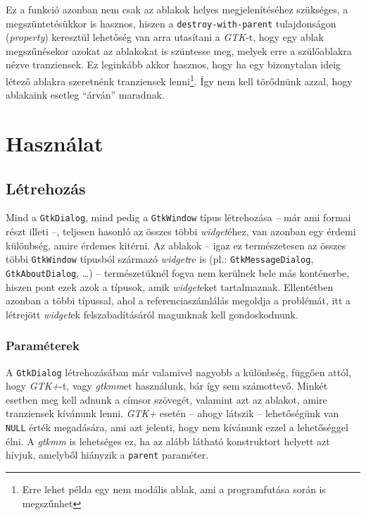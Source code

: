 Ez a funkció azonban nem csak az ablakok helyes megjelenítéséhez szükséges, a megszüntetésükkor is hasznos, hiszen a \texttt{destroy-with-parent} tulajdonságon (\textit{property}) keresztül lehetőség van arra utasítani a \textit{GTK}-t, hogy egy ablak megszűnésekor azokat az ablakokat is szüntesse meg, melyek erre a szülőablakra nézve tranziensek. Ez leginkább akkor hasznos, hogy ha egy bizonytalan ideig létező ablakra szeretnénk tranziensek lenni\footnote{Erre lehet példa egy nem modális ablak, ami a programfutása során is megszűnhet}. Így nem kell törődnünk azzal, hogy ablakaink esetleg ``árván'' maradnak.\label{par:windowdestroywithparent}

\section{Használat}

\subsection{Létrehozás}

Mind a \texttt{GtkDialog}, mind pedig a \texttt{GtkWindow} típus létrehozása -- már ami formai részt illeti --, teljesen hasonló az összes többi \textit{widget}éhez, van azonban egy érdemi különbség, amire érdemes kitérni. Az ablakok -- igaz ez természetesen az összes többi \texttt{GtkWindow} típusból származó \textit{widget}re is (pl.: \texttt{GtkMessageDialog}, \texttt{GtkAboutDialog}, \dots) -- természetüknél fogva nem kerülnek bele más konténerbe, hiszen pont ezek azok a típusok, amik \textit{widget}eket tartalmaznak. Ellentétben azonban a többi típussal, ahol a referenciaszámlálás megoldja a problémát, itt a létrejött \textit{widget}ek felszabadításáról magunknak kell gondoskodnunk.

\subsubsection{Paraméterek}

A \texttt{GtkDialog} létrehozásában már valamivel nagyobb a különbség, függően attól, hogy \textit{GTK+}-t, vagy \textit{gtkmm}et használunk, bár így sem számottevő. Minkét esetben meg kell adnunk a címsor szövegét, valamint azt az ablakot, amire tranziensek kívánunk lenni. \textit{GTK+} esetén -- ahogy látszik -- lehetőségünk van \texttt{NULL} érték megadására, ami azt jelenti, hogy nem kívánunk ezzel a lehetőséggel élni. A \textit{gtkmm} is lehetséges ez, ha az alább látható konstruktort helyett azt hívjuk, amelyből hiányzik a \texttt{parent} paraméter.

